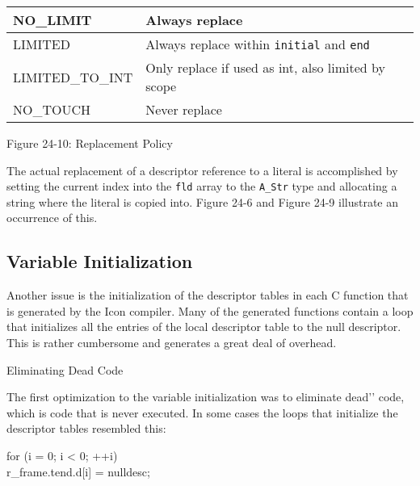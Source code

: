 \begin{center}
\tabletail{}
\tablelasttail{}
\begin{xtabular}{|m{1.4670599in}|m{3.2670598in}|}
\hline
{\ttfamily NO\_LIMIT} &
 Always replace\\\hline
{\ttfamily LIMITED} &
 Always replace within \texttt{initial} and \texttt{end}\\\hline
{\ttfamily LIMITED\_TO\_INT} &
 Only replace if used as int, also limited by scope\\\hline
{\ttfamily NO\_TOUCH} &
 Never replace\\\hline
\end{xtabular}
\end{center}
{\centering{}
Figure 24-10: Replacement Policy
\par}


The actual replacement of a descriptor reference to a literal is
accomplished by setting the current index into the \texttt{fld} array
to the \texttt{A\_Str} type and allocating a string where the literal
is copied into. Figure 24-6 and Figure 24-9 illustrate an occurrence
of this.

\subsection{Variable Initialization}

Another issue is the initialization of the descriptor tables in each C
function that is generated by the Icon compiler.  Many of the
generated functions contain a loop that initializes all the entries of
the local descriptor table to the null descriptor. This is rather
cumbersome and generates a great deal of overhead.

{\sffamily
Eliminating Dead Code}


The first optimization to the variable initialization was to eliminate
{\textasciigrave}{\textasciigrave}dead'{}' code, which is code that is
never executed. In some cases the loops that initialize the
descriptor tables resembled this:

\goodbreak
\begin{iconcode}
for (i = 0; i < 0; ++i)\\
\>r\_frame.tend.d[i] = nulldesc;\\
\end{iconcode}


